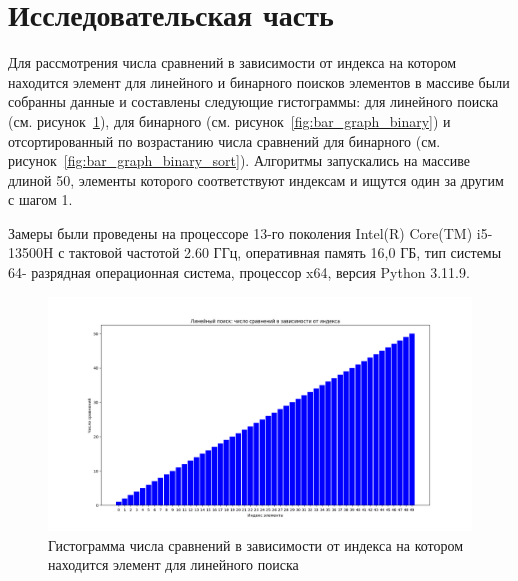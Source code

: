 \section{Исследовательская часть}

\hspace{1.25cm}
Для рассмотрения числа сравнений в зависимости от индекса на котором находится элемент для линейного и бинарного поисков элементов в массиве были собранны данные и составлены следующие гистограммы: для линейного поиска (см. рисунок~\ref{fig:bar_graph_linear}), для бинарного (см. рисунок~\ref{fig:bar_graph_binary}) и отсортированный по возрастанию числа сравнений для бинарного (см. рисунок~\ref{fig:bar_graph_binary_sort}). Алгоритмы запускались на массиве длиной 50, элементы которого соответствуют индексам и ищутся один за другим с шагом 1.

Замеры были проведены на процессоре 13-го поколения Intel(R) Core(TM) i5-
13500H с тактовой частотой 2.60 ГГц, оперативная память 16,0 ГБ, тип системы 64-
разрядная операционная система, процессор x64, версия Python 3.11.9.

\begin{figure}[H]
    \centering
    \includegraphics[width=1\textwidth]{img/bar_graph_linear.png}
    \caption{Гистограмма числа сравнений в зависимости от индекса на котором находится элемент для линейного поиска}
    \label{fig:bar_graph_linear} %
\end{figure}

